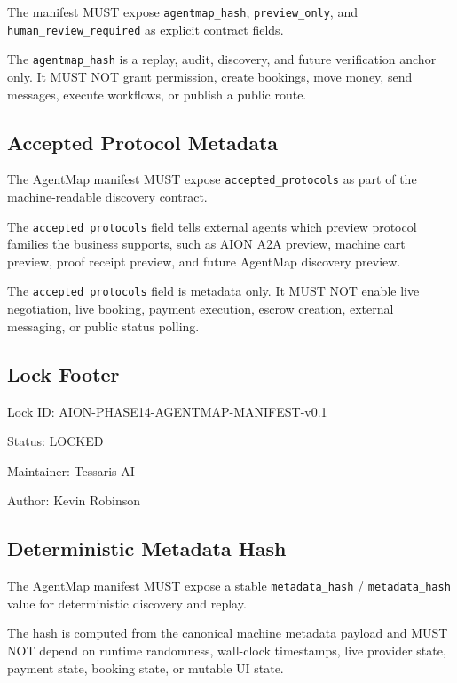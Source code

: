 The manifest MUST expose \texttt{agentmap_hash}, \texttt{preview_only}, and \texttt{human_review_required} as explicit contract fields.

The \texttt{agentmap_hash} is a replay, audit, discovery, and future verification anchor only. It MUST NOT grant permission, create bookings, move money, send messages, execute workflows, or publish a public route.



\subsection{Accepted Protocol Metadata}

The AgentMap manifest MUST expose \texttt{accepted_protocols} as part of the machine-readable discovery contract.

The \texttt{accepted_protocols} field tells external agents which preview protocol families the business supports, such as AION A2A preview, machine cart preview, proof receipt preview, and future AgentMap discovery preview.

The \texttt{accepted_protocols} field is metadata only. It MUST NOT enable live negotiation, live booking, payment execution, escrow creation, external messaging, or public status polling.

\subsection{Lock Footer}

Lock ID: AION-PHASE14-AGENTMAP-MANIFEST-v0.1

Status: LOCKED

Maintainer: Tessaris AI

Author: Kevin Robinson


\subsection{Deterministic Metadata Hash}

The AgentMap manifest MUST expose a stable \texttt{metadata\_hash} / \texttt{metadata_hash} value for deterministic discovery and replay.

The hash is computed from the canonical machine metadata payload and MUST NOT depend on runtime randomness, wall-clock timestamps, live provider state, payment state, booking state, or mutable UI state.

